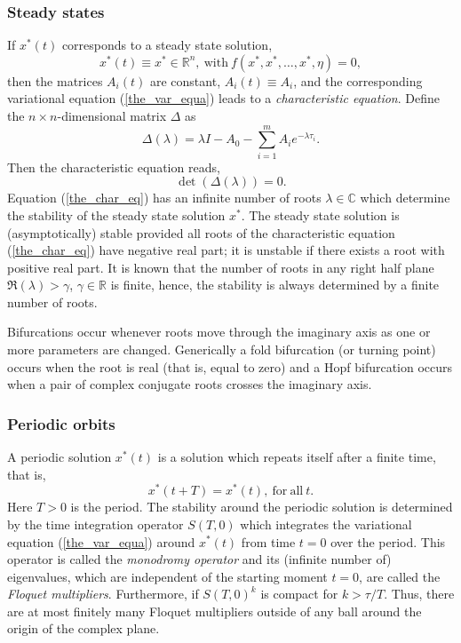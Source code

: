 \documentclass[10pt]{scrartcl}
\newcommand{\define}[1]{\emph{#1}}
\newcommand{\RR}{\mathbb{R}}
\newcommand{\CC}{\mathbb{C}}
\begin{document}
\subsubsection{Steady states}
\label{sec:dde:stst}
If $x^*(t)$ corresponds to a steady state solution,
\[
x^*(t)\equiv x^*\in\RR^n,\mathrm{\ with\ }f(x^*,x^*,\ldots,x^*,\eta)=0,
\]
then the matrices 
$A_i(t)$ are constant, $A_i(t)\equiv A_i$, and the corresponding 
variational equation (\ref{the_var_equa})
leads to a \define{characteristic equation}. Define the $n\times n$-dimensional
matrix $\Delta$ as
\begin{equation}
  \Delta(\lambda)=\lambda I - A_0 - \sum_{i=1}^m A_i e^{-\lambda\tau_i}.
\label{eq:deltadef}
\end{equation}
Then the characteristic equation reads,
\begin{equation}\label{the_char_eq}
\det(\Delta(\lambda))=0.
\end{equation}
Equation (\ref{the_char_eq}) has an infinite number of 
roots $\lambda\in\CC$ which determine the stability of the steady state
solution $x^*$.
The steady state solution is (asymptotically) stable provided all
roots of the characteristic equation (\ref{the_char_eq}) have
negative real part; it is unstable if there exists a root with positive
real part.
It is known that the number of roots in any right half plane
$\Re(\lambda)>\gamma$, $\gamma\in\RR$ is finite, hence, the
stability is always determined by a finite number of roots.

Bifurcations occur whenever roots move through the imaginary
axis as one or more parameters are changed.
Generically a fold bifurcation (or turning point) occurs when
the root is real (that is, equal to zero) and a 
Hopf bifurcation occurs when a pair of complex conjugate roots crosses the imaginary axis.

\subsubsection{Periodic orbits}
\label{sec:dde:psol}
A periodic solution $x^*(t)$ is a solution which repeats itself after
a finite time, that is,
\[ 
x^*(t+T)=x^*(t),\mathrm{\ for\ all\ }t. 
\]
Here $T>0$ is the period.  The stability around the periodic solution
is determined by the time integration operator $S(T,0)$ which
integrates the variational equation (\ref{the_var_equa}) around
$x^*(t)$ from time $t=0$ over the period.  This operator is called the
\define{monodromy operator} and its (infinite number of) eigenvalues,
which are independent of the starting moment $t=0$, are called the
\define{Floquet multipliers}.  Furthermore, if $S(T,0)^k$ is compact
for $k>\tau/T$. Thus, there are at most finitely many Floquet
multipliers outside of any ball around the origin of the complex
plane.
\end{document}
